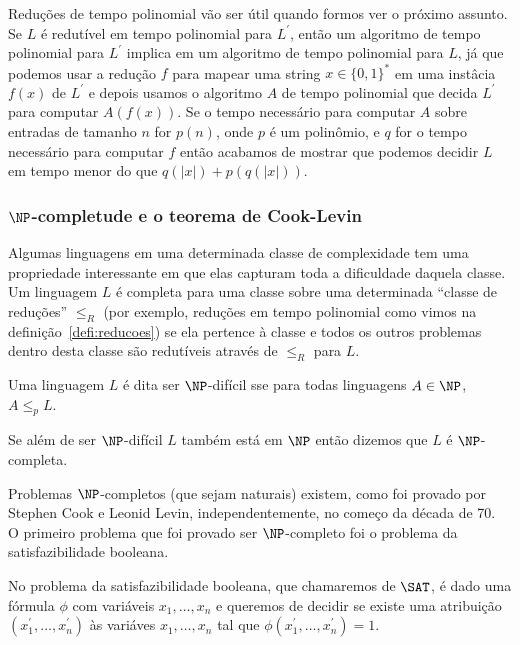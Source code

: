 Reduções de tempo polinomial vão ser útil quando formos ver o próximo assunto. Se $L$ é redutível em tempo polinomial para $L^{\prime}$, então um algoritmo de tempo polinomial para $L^{\prime}$ implica em um algoritmo de tempo polinomial para $L$, já que podemos usar a redução $f$ para mapear uma string $x \in \{0, 1\}^{*}$ em uma instâcia $f(x)$ de $L^{\prime}$ e depois usamos o algoritmo $A$ de tempo polinomial que decida $L^{\prime}$ para computar $A(f(x))$. Se o tempo necessário para computar $A$ sobre entradas de tamanho $n$ for $p(n)$, onde $p$ é um polinômio, e $q$ for o tempo necessário para computar $f$ então acabamos de mostrar que podemos decidir $L$ em tempo menor do que $q(\lvert x \rvert) + p(q(\lvert x \rvert))$. 


\subsubsection{$\NP$-completude e o teorema de Cook-Levin}

Algumas linguagens em uma determinada classe de complexidade tem uma propriedade interessante em que elas capturam toda a dificuldade daquela classe. Um linguagem $L$ é completa para uma classe sobre uma determinada ``classe de reduções'' $\leq_{R}$ (por exemplo, reduções em tempo polinomial como vimos na definição~\ref{defi:reducoes}) se ela pertence à classe e todos os outros problemas dentro desta classe são redutíveis através de $\leq_{R}$ para $L$.

\begin{defi} [$\NP$-completude] \label{defi:NPC}

Uma linguagem $L$ é dita ser $\NP$-difícil sse para todas linguagens $A \in \NP$, $A \leq_{p} L$.

Se além de ser $\NP$-difícil $L$ também está em $\NP$ então dizemos que $L$ é $\NP$-completa.

\end{defi}

Problemas $\NP$-completos (que sejam naturais) existem, como foi provado por Stephen Cook e Leonid Levin, independentemente, no começo da década de 70.~\cite{cook1971complexity, levin1973universal} O primeiro problema que foi provado ser $\NP$-completo foi o problema da satisfazibilidade booleana.

\begin{defi}  \label{defi:SAT}

No problema da satisfazibilidade booleana, que chamaremos de $\SAT$, é dado uma fórmula $\phi$ com variáveis $x_{1}, \dots, x_{n}$ e queremos de decidir se existe uma atribuição $(x_{1}^{\prime}, \dots, x_{n}^{\prime})$ às variáves $x_{1}, \dots, x_{n}$ tal que $\phi(x_{1}^{\prime}, \dots, x_{n}^{\prime}) = 1$.

\end{defi}

